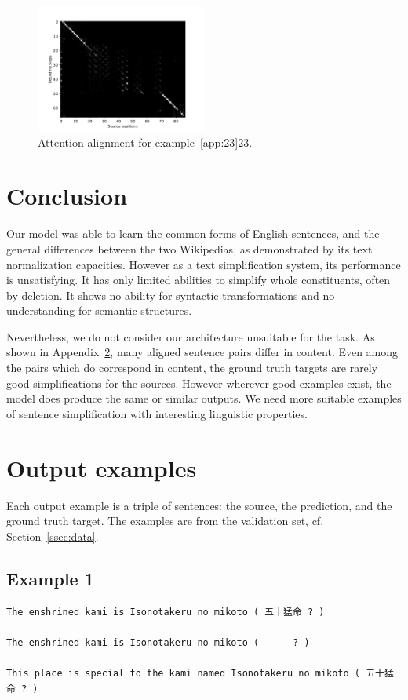 \documentclass[11pt,twocolumn]{article}
\begin{document}
\begin{figure}
  \centering
  \includegraphics[width=0.5\textwidth,page=1]{plot.pdf}
  \caption[]{\label{fig:align}Attention alignment for example~\ref{app:23}{23}.}
\end{figure}

\section{Conclusion}%
\label{sec:conclusion}

Our model was able to learn the common forms of English sentences,
and the general differences between the two Wikipedias,
as demonstrated by its text normalization capacities.
However as a text simplification system,
its performance is unsatisfying.
It has only limited abilities to simplify whole constituents,
often by deletion.
It shows no ability for syntactic transformations
and no understanding for semantic structures.

Nevertheless, we do not consider our architecture unsuitable for the task.
As shown in Appendix~\ref{sec:app},
many aligned sentence pairs differ in content.
Even among the pairs which do correspond in content,
the ground truth targets are rarely good simplifications for the sources.
However wherever good examples exist,
the model does produce the same or similar outputs.
We need more suitable examples of sentence simplification with interesting linguistic properties.

\printbibliography[]

\appendix
\onecolumn
\section{Output examples}
\label{sec:app}

Each output example is a triple of sentences:
the source, the prediction, and the ground truth target.
The examples are from the validation set, cf. Section~\ref{ssec:data}.

\subsection*{Example 1}
\label{app:1}
\begin{Verbatim}[fontsize=\scriptsize]
The enshrined kami is Isonotakeru no mikoto ( 五十猛命 ? )

The enshrined kami is Isonotakeru no mikoto (      ? )

This place is special to the kami named Isonotakeru no mikoto ( 五十猛命 ? )
\end{Verbatim}
\end{document}
